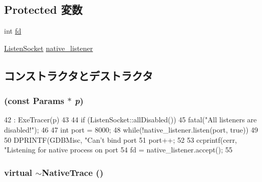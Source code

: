 \subsection*{Protected 変数}
\begin{DoxyCompactItemize}
\item 
int \hyperlink{classTrace_1_1NativeTrace_a6f8059414f0228f0256115e024eeed4b}{fd}
\item 
\hyperlink{classListenSocket}{ListenSocket} \hyperlink{classTrace_1_1NativeTrace_a4957ac3d974f1eb7680753acb7741ff5}{native\_\-listener}
\end{DoxyCompactItemize}


\subsection{コンストラクタとデストラクタ}
\hypertarget{classTrace_1_1NativeTrace_a73d1a7e24b851b9d944e0074e73d71ff}{
\subsubsection[{NativeTrace}]{ (const {\bf Params} $\ast$ {\em p})}}
\label{classTrace_1_1NativeTrace_a73d1a7e24b851b9d944e0074e73d71ff}



\begin{DoxyCode}
42     : ExeTracer(p)
43 {
44     if (ListenSocket::allDisabled())
45         fatal("All listeners are disabled!");
46 
47     int port = 8000;
48     while(!native_listener.listen(port, true))
49     {
50         DPRINTF(GDBMisc, "Can't bind port %
51         port++;
52     }
53     ccprintf(cerr, "Listening for native process on port %
54     fd = native_listener.accept();
55 }
\end{DoxyCode}
\hypertarget{classTrace_1_1NativeTrace_ab5703d1f8d7d995360c983a67a9af032}{
\subsubsection[{$\sim$NativeTrace}]{\setlength{\rightskip}{0pt plus 5cm}virtual $\sim${\bf NativeTrace} ()}}
\label{classTrace_1_1NativeTrace_ab5703d1f8d7d995360c983a67a9af032}



